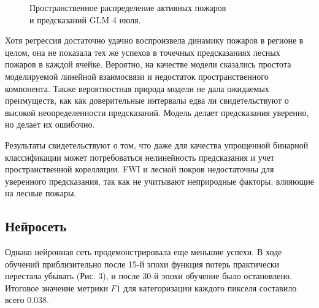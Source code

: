 \documentclass[a4paper,article,14pt]{extarticle}
\begin{document}
\begin{figure}[ht]
\begin{center}
\caption{
\label{cinema}
	Пространственное распределение активных пожаров\\ и предсказаний GLM 4 июля.
}
\end {center}
\end {figure}

Хотя регрессия достаточно удачно воспроизвела динамику пожаров в регионе в целом, она не показала тех же успехов в точечных предсказаниях лесных пожаров в каждой ячейке. Вероятно, на качестве модели сказались простота моделируемой линейной взаимосвязи и недостаток пространственного компонента. Также вероятностная природа модели не дала ожидаемых преимуществ, как как доверительные интервалы едва ли свидетельствуют о высокой неопределенности предсказаний. Модель делает предсказания уверенно, но делает их ошибочно.

Результаты свидетельствуют о том, что даже для качества упрощенной бинарной классификации может потребоваться нелинейность предсказания и учет пространственной корелляции. FWI и лесной покров недостаточны для уверенного предсказания, так как не учитывают неприродные факторы, влияющие на лесные пожары.

\subsection{Нейросеть}

Однако нейронная сеть продемонстрировала еще меньшие успехи. В ходе обучений приблизительно после 15-й эпохи функция потерь практически перестала убывать (Рис. 3), и после 30-й эпохи обучение было остановлено. Итоговое значение метрики $F1$ для категоризации каждого пикселя составило всего $0.038$.
\end{document}
